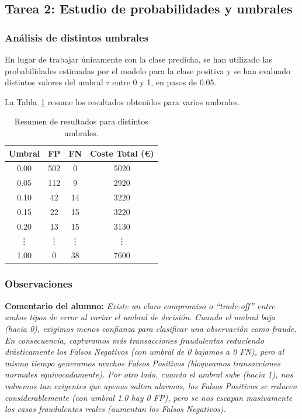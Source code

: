 \subsection{Tarea 2: Estudio de probabilidades y umbrales}

\subsubsection{Análisis de distintos umbrales}
En lugar de trabajar únicamente con la clase predicha, se han utilizado las probabilidades estimadas por el modelo para la clase positiva y se han evaluado distintos valores del umbral \(\tau\) entre 0 y 1, en pasos de 0.05.

La Tabla~\ref{tab:umbrales_coste} resume los resultados obtenidos para varios umbrales.

\begin{table}[H]
  \centering
  \caption{Resumen de resultados para distintos umbrales.}
  \label{tab:umbrales_coste}
  \begin{tabular}{c c c c}
    \toprule
    \textbf{Umbral} & \textbf{FP} & \textbf{FN} & \textbf{Coste Total (€)} \\
    \midrule
    0.00            & 502         & 0           & 5020                     \\
    0.05            & 112         & 9           & 2920                     \\
    0.10            & 42          & 14          & 3220                     \\
    0.15            & 22          & 15          & 3220                     \\
    0.20            & 13          & 15          & 3130                     \\
    \vdots          & \vdots      & \vdots      & \vdots                   \\
    1.00            & 0           & 38          & 7600                     \\
    \bottomrule
  \end{tabular}
\end{table}

\subsubsection{Observaciones}
\textbf{Comentario del alumno:}
\textit{Existe un claro compromiso o ``trade-off'' entre ambos tipos de error al variar el umbral de decisión. Cuando el umbral baja (hacia 0), exigimos menos confianza para clasificar una observación como fraude. En consecuencia, capturamos más transacciones fraudulentas reduciendo drásticamente los Falsos Negativos (con umbral de 0 bajamos a 0 FN), pero al mismo tiempo generamos muchos Falsos Positivos (bloqueamos transacciones normales equivocadamente).
  Por otro lado, cuando el umbral sube (hacia 1), nos volvemos tan exigentes que apenas saltan alarmas, los Falsos Positivos se reducen considerablemente (con umbral 1.0 hay 0 FP), pero se nos escapan masivamente los casos fraudulentos reales (aumentan los Falsos Negativos). }

